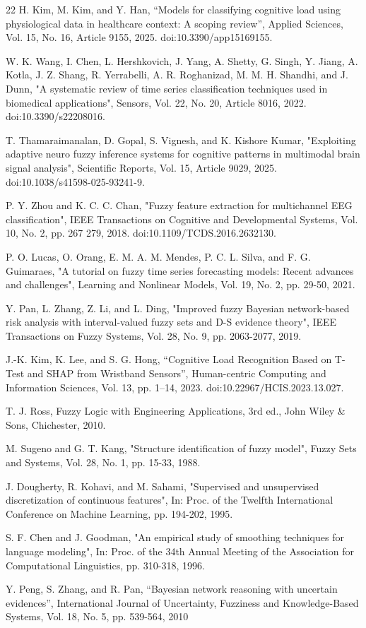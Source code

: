 \documentclass[runningheads]{llncs}
\begin{document}
\begin{thebibliography}{22}
 H. Kim, M. Kim, and Y. Han, ``Models for classifying cognitive load using physiological data in healthcare context: A scoping review'', Applied Sciences, Vol. 15, No. 16, Article 9155, 2025. doi:10.3390/app15169155.

 W. K. Wang, I. Chen, L. Hershkovich, J. Yang, A. Shetty, G. Singh, Y. Jiang, A. Kotla, J. Z. Shang, R. Yerrabelli, A. R. Roghanizad, M. M. H. Shandhi, and J. Dunn, "A systematic review of time series classification techniques used in biomedical applications", Sensors, Vol. 22, No. 20, Article 8016, 2022. doi:10.3390/s22208016.

 T. Thamaraimanalan, D. Gopal, S. Vignesh, and K. Kishore Kumar, "Exploiting adaptive neuro fuzzy inference systems for cognitive patterns in multimodal brain signal analysis", Scientific Reports, Vol. 15, Article 9029, 2025. doi:10.1038/s41598-025-93241-9.

 P. Y. Zhou and K. C. C. Chan, "Fuzzy feature extraction for multichannel EEG classification", IEEE Transactions on Cognitive and Developmental Systems, Vol. 10, No. 2, pp. 267 279, 2018. doi:10.1109/TCDS.2016.2632130.

 P. O. Lucas, O. Orang, E. M. A. M. Mendes, P. C. L. Silva, and F. G. Guimaraes, "A tutorial on fuzzy time series forecasting models: Recent advances and challenges", Learning and Nonlinear Models, Vol. 19, No. 2, pp. 29-50, 2021.

 Y. Pan, L. Zhang, Z. Li, and L. Ding, "Improved fuzzy Bayesian network-based risk analysis with interval-valued fuzzy sets and D-S evidence theory", IEEE Transactions on Fuzzy Systems, Vol. 28, No. 9, pp. 2063-2077, 2019.

 J.-K. Kim, K. Lee, and S. G. Hong, ``Cognitive Load Recognition Based on T-Test and SHAP from Wristband Sensors'', Human-centric Computing and Information Sciences, Vol. 13, pp. 1--14, 2023. doi:10.22967/HCIS.2023.13.027.

 T. J. Ross, Fuzzy Logic with Engineering Applications, 3rd ed., John Wiley \& Sons, Chichester, 2010.

 M. Sugeno and G. T. Kang, "Structure identification of fuzzy model", Fuzzy Sets and Systems, Vol. 28, No. 1, pp. 15-33, 1988.

 J. Dougherty, R. Kohavi, and M. Sahami, "Supervised and unsupervised discretization of continuous features", In: Proc. of the Twelfth International Conference on Machine Learning, pp. 194-202, 1995.

 S. F. Chen and J. Goodman, "An empirical study of smoothing techniques for language modeling", In: Proc. of the 34th Annual Meeting of the Association for Computational Linguistics, pp. 310-318, 1996.

 Y. Peng, S. Zhang, and R. Pan, ``Bayesian network reasoning with uncertain evidences'', International Journal of Uncertainty, Fuzziness and Knowledge-Based Systems, Vol. 18, No. 5, pp. 539-564, 2010

\end{thebibliography}
\end{document}
